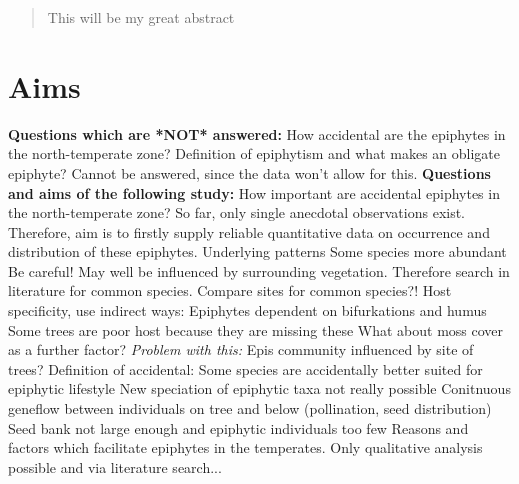 \documentclass[12pt, a4paper, oneside, draft]{article}
\begin{document}
 \doublespacing



\begin{abstract}
	This will be my great abstract
\end{abstract}
\newpage

\tableofcontents
\newpage

\section*{Aims}

\begin{outline}
\0 \textbf{Questions which are *NOT* answered:}
	\1 How accidental are the epiphytes in the north-temperate zone?
	\1 Definition of epiphytism and what makes an obligate epiphyte?
		\2 Cannot be answered, since the data won't allow for this.
\0 \textbf{Questions and aims of the following study:}
	\1 How important are accidental epiphytes in the north-temperate zone?
		\2 So far, only single anecdotal observations exist.
		\2 Therefore, aim is to firstly supply reliable quantitative data on occurrence and distribution of these epiphytes.
	\1 Underlying patterns
		\2 Some species more abundant
			\3 Be careful! May well be influenced by surrounding vegetation.
			\3 Therefore search in literature for common species.
			\3 Compare sites for common species?!
		\2 Host specificity, use indirect ways:
			\3 Epiphytes dependent on bifurkations and humus
			\3[\textrightarrow] Some trees are poor host because they are missing these
			\3 What about moss cover as a further factor?
			\3 \emph{Problem with this:} Epis community influenced by site of trees?
	\1 Definition of accidental:
		\2 Some species are accidentally better suited for epiphytic lifestyle
		\2 New speciation of epiphytic taxa not really possible
			\3 Conitnuous geneflow between individuals on tree and below (pollination, seed distribution)
			\3 Seed bank not large enough and epiphytic individuals too few
	\1 Reasons and factors which facilitate epiphytes in the temperates.
		\2 Only qualitative analysis possible and via literature search...		
\end{outline}
\end{document}

